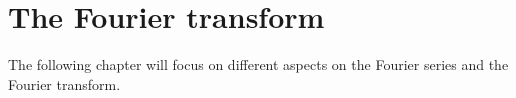 \section{The Fourier transform}
The following chapter will focus on different aspects on the Fourier series and the Fourier transform.